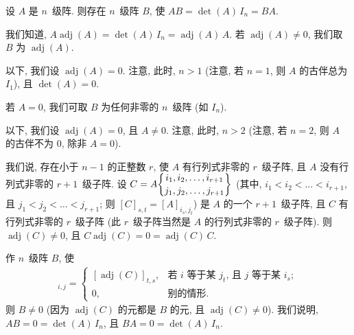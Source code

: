 \documentclass[../libro.tex]{subfiles}
\begin{document}
\begin{example}
    设 \(A\) 是 \(n\)~级阵.
    则存在 \(n\)~级阵 \(B\),
    使 \(AB = \det {(A)}\, I_n = BA\).

    我们知道, \(A \operatorname{adj} {(A)}
        = \det {(A)}\, I_n
    = \operatorname{adj} {(A)}\, A\).
    若 \(\operatorname{adj} {(A)} \neq 0\),
    我们取 \(B\) 为 \(\operatorname{adj} {(A)}\).

    以下, 我们设 \(\operatorname{adj} {(A)} = 0\).
    注意, 此时, \(n > 1\)
    (注意, 若 \(n = 1\), 则 \(A\) 的古伴总为 \(I_1\)),
    且 \(\det {(A)} = 0\).

    若 \(A = 0\), 我们可取 \(B\) 为任何非零的 \(n\)~级阵
    (如 \(I_n\)).

    以下, 我们设 \(\operatorname{adj} {(A)} = 0\),
    且 \(A \neq 0\).
    注意, 此时, \(n > 2\)
    (注意, 若 \(n = 2\), 则 \(A\) 的古伴不为 \(0\),
    除非 \(A = 0\)).

    我们说, 存在小于 \(n-1\) 的正整数 \(r\),
    使 \(A\) 有行列式非零的 \(r\)~级子阵,
    且 \(A\) 没有行列式非零的 \(r+1\)~级子阵.
    设
    \(C = A\submat{i_1,i_2,\dots,i_{r+1}}{j_1,j_2,\dots,j_{r+1}}\)
    (其中, \(i_1 < i_2 < \dots < i_{r+1}\), %
    且 \(j_1 < j_2 < \dots < j_{r+1}\);
    则 \([C]_{s,t} = [A]_{i_s,j_t}\)) %
    是 \(A\) 的一个 \(r+1\)~级子阵,
    且 \(C\) 有行列式非零的 \(r\)~级子阵
    (此 \(r\)~级子阵当然是 \(A\) 的行列式非零的 \(r\)~级子阵).
    则 \(\operatorname{adj} {(C)} \neq 0\),
    且 \(C \operatorname{adj} {(C)} = 0
    = \operatorname{adj} {(C)}\, C\).

    作 \(n\)~级阵 \(B\), 使
    \begin{align*}
        [B]_{i,j} =
        \begin{cases}
            [\operatorname{adj} {(C)}]_{t,s},
            & \text{若 \(i\) 等于某 \(j_t\), 且 \(j\) 等于某 \(i_s\)};
            \\
            0,
            & \text{别的情形}.
        \end{cases}
    \end{align*}
    则 \(B \neq 0\)
    (因为 \(\operatorname{adj} {(C)}\) 的元都是 \(B\) 的元,
    且 \(\operatorname{adj} {(C)} \neq 0\)).
    我们说明, \(A B = 0 = \det {(A)}\, I_n\),
    且 \(B A = 0 = \det {(A)}\, I_n\).


\end{example}
\end{document}
